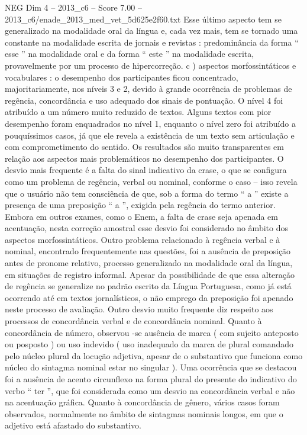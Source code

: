 \begin{textsample}{NEG Dim 4 – 2013\_c6 – Score 7.00 – 2013\_c6/enade\_2013\_med\_vet\_5d625e2f60.txt}
Esse último aspecto tem se generalizado na modalidade oral da língua e, cada vez mais, tem se tornado uma constante na modalidade escrita de jornais e revistas : predominância da forma “ esse ” na modalidade oral e da forma “ este ” na modalidade escrita, provavelmente por um processo de hipercorreção. c ) aspectos morfossintáticos e vocabulares : o desempenho dos participantes ficou concentrado, majoritariamente, nos níveis 3 e 2, devido à grande ocorrência de problemas de regência, concordância e uso adequado dos sinais de pontuação.
O nível 4 foi atribuído a um número muito reduzido de textos.
Alguns textos com pior desempenho foram enquadrados no nível 1, enquanto o nível zero foi atribuído a pouquíssimos casos, já que ele revela a existência de um texto sem articulação e com comprometimento do sentido.
Os resultados são muito transparentes em relação aos aspectos mais problemáticos no desempenho dos participantes.
O desvio mais frequente é a falta do sinal indicativo da crase, o que se configura como um problema de regência, verbal ou nominal, conforme o caso – isso revela que o usuário não tem consciência de que, sob a forma do termo “ a ” existe a presença de uma preposição “ a ”, exigida pela regência do termo anterior.
Embora em outros exames, como o Enem, a falta de crase seja apenada em acentuação, nesta correção amostral esse desvio foi considerado no âmbito dos aspectos morfossintáticos.
Outro problema relacionado à regência verbal e à nominal, encontrado frequentemente nas questões, foi a ausência de preposição antes de pronome relativo, processo generalizado na modalidade oral da língua, em situações de registro informal.
Apesar da possibilidade de que essa alteração de regência se generalize no padrão escrito da Língua Portuguesa, como já está ocorrendo até em textos jornalísticos, o não emprego da preposição foi apenado neste processo de avaliação.
Outro desvio muito frequente diz respeito aos processos de concordância verbal e de concordância nominal.
Quanto à concordância de número, observou -se ausência de marca ( com sujeito anteposto ou posposto ) ou uso indevido ( uso inadequado da marca de plural comandado pelo núcleo plural da locução adjetiva, apesar de o substantivo que funciona como núcleo do sintagma nominal estar no singular ).
Uma ocorrência que se destacou foi a ausência de acento circunflexo na forma plural do presente do indicativo do verbo “ ter ”, que foi considerada como um desvio na concordância verbal e não na acentuação gráfica.
Quanto à concordância de gênero, vários casos foram observados, normalmente no âmbito de sintagmas nominais longos, em que o adjetivo está afastado do substantivo.

\end{textsample}
